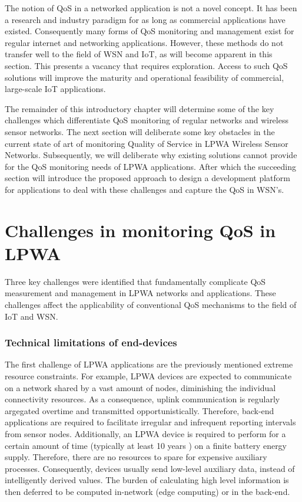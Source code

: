 The notion of QoS in a networked application is not a novel concept. It has been a research and industry paradigm for as long as commercial applications have existed. Consequently many forms of QoS monitoring and management exist for regular internet and networking applications. However, these methods do not transfer well to the field of WSN and IoT, as will become apparent in this section. This presents a vacancy that requires exploration. Access to such QoS solutions will improve the maturity and operational feasibility of commercial, large-scale IoT applications.

The remainder of this introductory chapter will determine some of the key challenges which differentiate QoS monitoring of regular networks and wireless sensor networks. The next section will deliberate some key obstacles in the current state of art of monitoring Quality of Service in LPWA Wireless Sensor Networks. Subsequently, we will deliberate why existing solutions cannot provide for the QoS monitoring  needs of LPWA applications. After which the succeeding section will introduce the proposed approach to design a development platform for applications to deal with these challenges and capture the QoS in WSN's.


\section{Challenges in monitoring QoS in LPWA}
\label{sec:challenges}
Three key challenges were identified that fundamentally complicate QoS measurement and management in LPWA networks and applications. These challenges affect the applicability of conventional QoS mechanisms to the field of IoT and WSN. %

\subsubsection{Technical limitations of end-devices}
The first challenge of LPWA applications are the previously mentioned extreme resource constraints. For example, LPWA devices are expected to communicate on a network shared by a vast amount of nodes, diminishing the individual connectivity resources. As a consequence, uplink communication is regularly argegated overtime and transmitted opportunistically. Therefore, back-end applications are required to facilitate irregular and infrequent reporting intervals from sensor nodes. Additionally, an LPWA device is required to perform for a certain amount of time (typically at least 10 years \cite{tmobile, vodafone}) on a finite battery energy supply. Therefore, there are no resources to spare for expensive auxiliary processes. Consequently, devices usually send low-level auxiliary data, instead of intelligently derived values. The burden of calculating high level information is then deferred to be computed in-network (edge computing) or in the back-end. 

